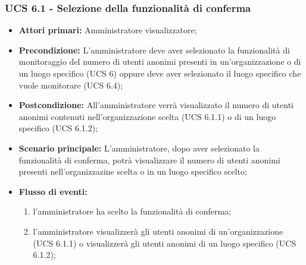 \subsubsection{UCS 6.1 - Selezione della funzionalità di conferma}
\begin{itemize}
	\item \textbf{Attori primari:} Amministratore visualizzatore;
	\item \textbf{Precondizione:} L'amministratore deve aver selezionato la funzionalità di monitoraggio del numero di utenti anonimi presenti in un'organizzazione o di un luogo specifico (UCS 6) oppure deve aver selezionato il luogo specifico che vuole monitorare (UCS 6.4);
	\item \textbf{Postcondizione:} All'amministratore verrà visualizzato il numero di utenti anonimi contenuti nell'organizzazione scelta (UCS 6.1.1) o di un luogo specifico (UCS 6.1.2);
	\item \textbf{Scenario principale:} L'amministratore, dopo aver selezionato la funzionalità di conferma, potrà visualizzare il numero di utenti anonimi presenti nell'organizzazine scelta o in un luogo specifico scelto;
	\item \textbf{Flusso di eventi:} 
	\begin{enumerate}
		\item l'amministratore ha scelto la funzionalità di conferma;
		\item l'amministratore visualizzerà gli utenti anonimi di un'organizzazione (UCS 6.1.1) o visualizzerà gli utenti anonimi di un luogo specifico (UCS 6.1.2);
	\end{enumerate}
\end{itemize}

